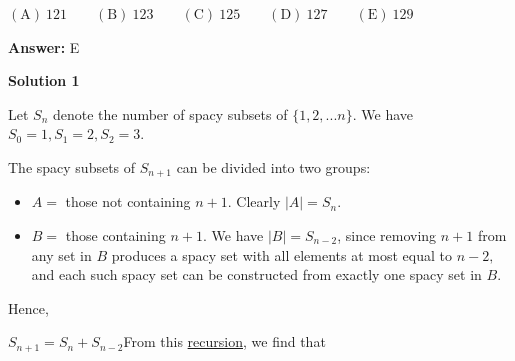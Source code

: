 \begin{enumerate}
 $\mathrm{(A)}\ 121 \qquad \mathrm{(B)}\ 123 \qquad \mathrm{(C)}\ 125 \qquad \mathrm{(D)}\ 127 \qquad \mathrm{(E)}\ 129$

 \textbf{Answer: }E



\textbf{Solution 1}

Let $S_{n}$ denote the number of spacy subsets of $\{ 1, 2, ... n \}$.  We have $S_{0} = 1, S_{1} = 2, S_{2} = 3$.  

 The spacy subsets of $S_{n + 1}$ can be divided into two groups:

 
            \begin{itemize}
        \item $A =$ those not containing $n + 1$.  Clearly $|A|=S_{n}$.
        \item $B =$ those containing $n + 1$. We have $|B|=S_{n - 2}$, since removing $n + 1$ from any set in $B$ produces a spacy set with all elements at most equal to $n - 2,$ and each such spacy set can be constructed from exactly one spacy set in $B$.
            \end{itemize}
            Hence,

 $S_{n + 1} = S_{n} + S_{n - 2}$From this \href{https://artofproblemsolving.com/wiki/index.php?title=Recursion}{recursion}, we find that

 


\end{enumerate}